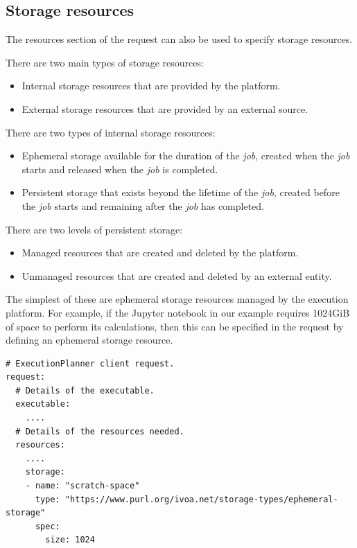 \documentclass[11pt,a4paper]{ivoa}
\newcommand{\jupyternotebook} {Jupyter notebook}
\newcommand{\job} {\textit{job}}
\begin{document}
\subsection{Storage resources}
\label{storage-resources}

The resources section of the request can also be used to specify storage resources.

There are two main types of storage resources:
\begin{itemize}
    \item Internal storage resources that are provided by the platform.
    \item External storage resources that are provided by an external source.
\end{itemize}

There are two types of internal storage resources:
\begin{itemize}
    \item Ephemeral storage available for the duration of the \job{}, created when the \job{} starts and released when the \job{} is completed.
    \item Persistent storage that exists beyond the lifetime of the \job{}, created before the \job{} starts and remaining after the \job{} has completed.
\end{itemize}

There are two levels of persistent storage:
\begin{itemize}
    \item Managed resources that are created and deleted by the platform.
    \item Unmanaged resources that are created and deleted by an external entity.
\end{itemize}

The simplest of these are ephemeral storage resources managed by the execution platform.
For example, if the \jupyternotebook{} in our example requires 1024GiB of space to perform its calculations,
then this can be specified in the request by defining an ephemeral storage resource.

\begin{lstlisting}[]
# ExecutionPlanner client request.
request:
  # Details of the executable.
  executable:
    ....
  # Details of the resources needed.
  resources:
    ....
    storage:
    - name: "scratch-space"
      type: "https://www.purl.org/ivoa.net/storage-types/ephemeral-storage"
      spec:
        size: 1024
\end{lstlisting}
\end{document}
